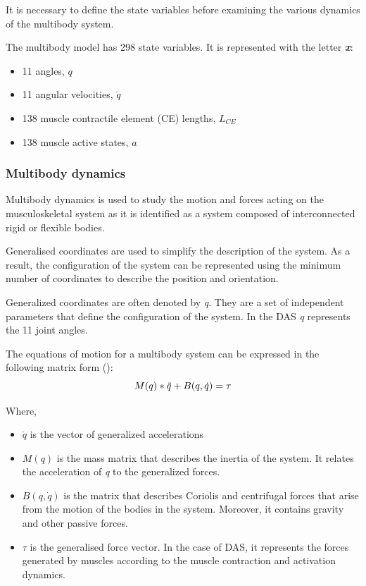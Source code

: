 It is necessary to define the state variables before examining the various dynamics of the multibody system.

The multibody model has 298 state variables. It is represented with the letter\textbf{ \textit{x}}:
\begin{itemize}
    \item 11 angles, $q$
    \item 11 angular velocities, $\dot{q}$
    \item 138 muscle contractile element (CE) lengths, $L_{CE}$
    \item 138 muscle active states, $a$
\end{itemize}

 
\subsubsection{Multibody dynamics}

Multibody dynamics is used to study the motion and forces acting on the musculoskeletal system as it is identified as a system composed of interconnected rigid or flexible bodies. 

Generalised coordinates are used to simplify the description of the system. As a result, the configuration of the system can be represented using the minimum number of coordinates to describe the position and orientation.  

Generalized coordinates are often denoted by \textit{q}. They are a set of independent parameters that define the configuration of the system. In the \ac{DAS} \textit{q} represents the 11 joint angles. 

The equations of motion for a multibody system can be expressed in the following matrix form (\cite{Siciliano2009}):
\begin{equation}
    M(q)*\Ddot{q} + B(q,\dot{q}) = \tau
    \label{eq:MBD}
\end{equation}

Where,
\begin{itemize}
    \item $\ddot{q}$ is the vector of generalized accelerations
    \item $M(q)$ is the mass matrix that describes the inertia of the system. It relates the acceleration of \textit{q} to the generalized forces.
    \item $B(q,\dot{q})$ is the matrix that describes Coriolis and centrifugal forces that arise from the motion of the bodies in the system. Moreover, it contains gravity and other passive forces.
    \item $\tau$ is the generalised force vector. In the case of \ac{DAS}, it represents the forces generated by muscles according to the muscle contraction and activation dynamics. 
\end{itemize}

